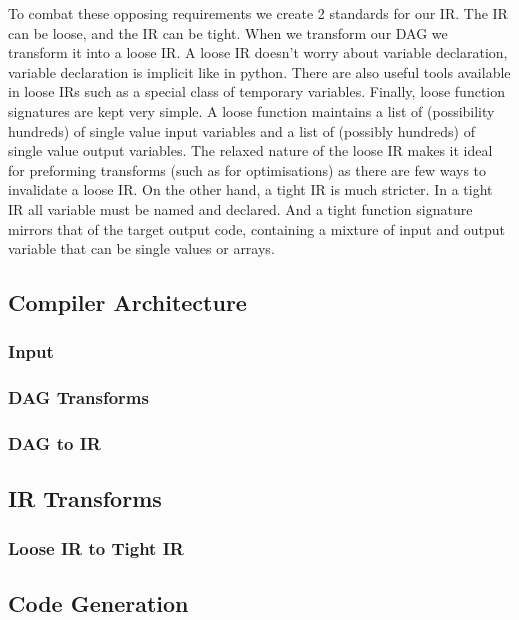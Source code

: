 To combat these opposing requirements we create 2 standards for our IR.
The IR can be loose, and the IR can be tight.
When we transform our DAG we transform it into a loose IR.
A loose IR doesn't worry about variable declaration, variable declaration is implicit like in python.
There are also useful tools available in loose IRs such as a special class of temporary variables.
Finally, loose function signatures are kept very simple.
A loose function maintains a list of (possibility hundreds) of single value input variables and a list of (possibly hundreds) of single value output variables.
The relaxed nature of the loose IR makes it ideal for preforming transforms (such as for optimisations) as there are few ways to invalidate a loose IR.
On the other hand, a tight IR is much stricter.
In a tight IR all variable must be named and declared.
And a tight function signature mirrors that of the target output code, containing a mixture of input and output variable that can be single values or arrays.



\subsection{Compiler Architecture}
\subsubsection{Input}

\subsubsection{DAG Transforms}
% 

\subsubsection{DAG to IR}

\subsection{IR Transforms}

\subsubsection{Loose IR to Tight IR}


\subsection{Code Generation}
